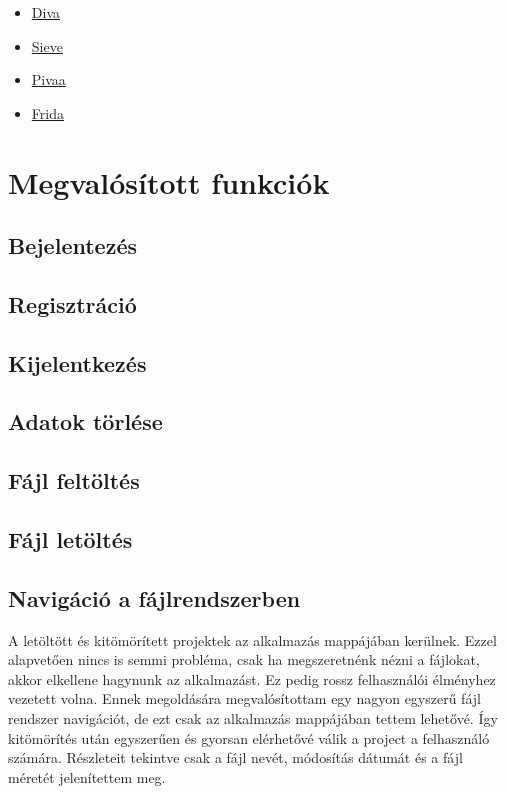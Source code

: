 \documentclass{thesis-ekf}
\theoremstyle{definition}
\theoremstyle{remark}
\begin{document}
\begin{itemize}
	\item \href{https://github.com/payatu/diva-android}{Diva}
	\item \href{https://github.com/as0ler/Android-Examples}{Sieve}
	\item \href{https://github.com/htbridge/pivaa}{Pivaa}
	\item \href{https://github.com/t0thkr1s/frida-demo}{Frida}
\end{itemize}

\chapter{Megvalósított funkciók}\label{funkciok}

\section{Bejelentezés}

\section{Regisztráció}

\section{Kijelentkezés}

\section{Adatok törlése}

\section{Fájl feltöltés}

\section{Fájl letöltés}

\section{Navigáció a fájlrendszerben}

A letöltött és kitömörített projektek az alkalmazás mappájában kerülnek.
Ezzel alapvetően nincs is semmi probléma, csak ha megszeretnénk nézni a fájlokat, akkor elkellene hagynunk az alkalmazást.
Ez pedig rossz felhasználói élményhez vezetett volna.
Ennek megoldására megvalósítottam egy nagyon egyszerű fájl rendszer navigációt, de ezt csak az alkalmazás mappájában tettem lehetővé.
Így kitömörítés után egyszerűen és gyorsan elérhetővé válik a project a felhasználó számára.
Részleteit tekintve csak a fájl nevét, módosítás dátumát és a fájl méretét jelenítettem meg.
\end{document}
